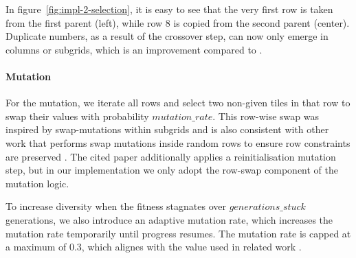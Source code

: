 In figure~\ref{fig:impl-2-selection}, it is easy to see that the very first row is taken from the first parent (left), while row 8 is copied from the second parent (center). Duplicate numbers, as a result of the crossover step, can now only emerge in columns or subgrids, which is an improvement compared to .

\paragraph{Mutation} For the mutation, we iterate all rows and select two non-given tiles in that row to swap their values with probability \(mutation\_rate\). This row-wise swap was inspired by swap-mutations within subgrids and is also consistent with other work that performs swap mutations inside random rows to ensure row constraints are preserved \cite{Wang2024, Sato2011, Mantere2007}. The cited paper additionally applies a reinitialisation mutation step, but in our implementation we only adopt the row-swap component of the mutation logic.

To increase diversity when the fitness stagnates over $generations\_stuck$ generations, we also introduce an adaptive mutation rate, which increases the mutation rate temporarily until progress resumes. The mutation rate is capped at a maximum of \(0.3\), which alignes with the value used in related work \cite{Sato2011}.

